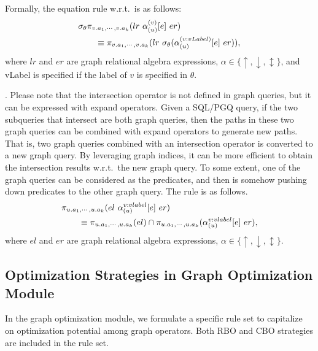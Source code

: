 Formally, the equation rule w.r.t.~\filterrule is as follows:
\begin{equation}
    \begin{split}
    & \sigma_{\theta}\pi_{v.a_1, \cdots, v.a_k}(lr~\alpha_{(u)}^{(v)}[e]~er) \\
    & \hspace*{2em} \equiv \pi_{v.a_1, \cdots, v.a_k}(lr~\sigma_{\theta}(\alpha_{(u)}^{(v:vLabel)}[e]~er)), \\
    \end{split}
\end{equation}
where $lr$ and $er$ are graph relational algebra expressions, $\alpha \in \{\uparrow, \downarrow, \updownarrow\}$, and vLabel is specified if the label of $v$ is specified in $\theta$.


\intersectrule. 
Please note that the intersection operator is not defined in graph queries, but it can be expressed with expand operators.
Given a SQL/PGQ query, if the two subqueries that intersect are both graph queries, then the paths in these two graph queries can be combined with expand operators to generate new paths.
That is, two graph queries combined with an intersection operator is converted to a new graph query.
By leveraging graph indices, it can be more efficient to obtain the intersection results w.r.t.~the new graph query.
To some extent, one of the graph queries can be considered as the predicates, and then \intersectrule is somehow pushing down predicates to the other graph query.
The rule is as follows.
\begin{equation}
    \begin{split}
        & \pi_{u.a_1, \cdots, u.a_k}(el~\alpha_{(u)}^{v:vlabel}[e]~er) \\
        & \hspace*{2em} \equiv \pi_{u.a_1, \cdots, u.a_k}(el) \cap \pi_{u.a_1, \cdots, u.a_k}(\alpha_{(u)}^{v:vlabel}[e]~er),
    \end{split}
\end{equation}
where $el$ and $er$ are graph relational algebra expressions, $\alpha \in \{\uparrow, \downarrow, \updownarrow\}$.



\subsection{Optimization Strategies in Graph Optimization Module}

In the graph optimization module, we formulate a specific rule set to capitalize on optimization potential among graph operators. 
Both RBO and CBO strategies are included in the rule set.

